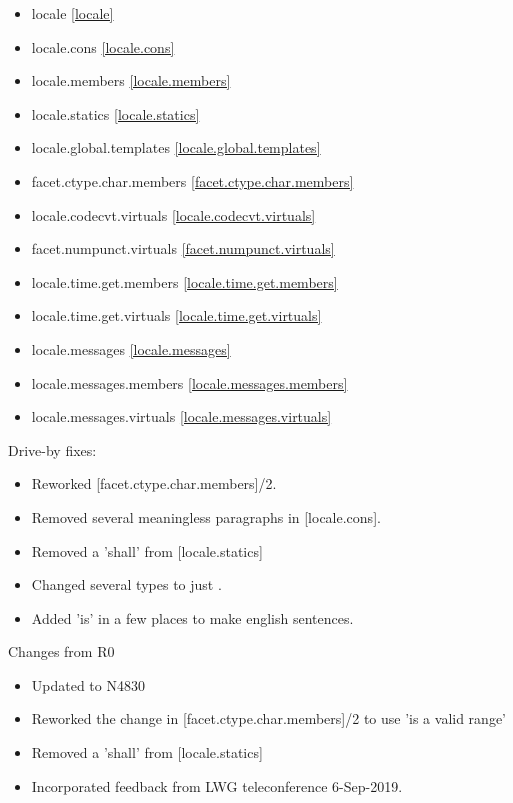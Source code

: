 \begin{multicols}{2}
\begin{itemize}
\item{locale}						\ref{locale}
\item{locale.cons}					\ref{locale.cons}
\item{locale.members}				\ref{locale.members}
\item{locale.statics}				\ref{locale.statics}
\item{locale.global.templates}		\ref{locale.global.templates}
\item{facet.ctype.char.members}		\ref{facet.ctype.char.members}
\item{locale.codecvt.virtuals}		\ref{locale.codecvt.virtuals}
\item{facet.numpunct.virtuals}		\ref{facet.numpunct.virtuals}
\item{locale.time.get.members}		\ref{locale.time.get.members}
\item{locale.time.get.virtuals}		\ref{locale.time.get.virtuals}
\item{locale.messages}				\ref{locale.messages}
\item{locale.messages.members}		\ref{locale.messages.members}
\item{locale.messages.virtuals}		\ref{locale.messages.virtuals}
\end{itemize}
\end{multicols}

Drive-by fixes:
\begin{itemize}
\item{Reworked [facet.ctype.char.members]/2.}
\item{Removed several meaningless paragraphs in [locale.cons].}
\item{Removed a 'shall' from [locale.statics]}
\item{Changed several  types to just .}
\item{Added 'is' in a few places to make english sentences.}
\end{itemize}

Changes from R0
\begin{itemize}
\item{Updated to N4830}
\item{Reworked the change in [facet.ctype.char.members]/2 to use 'is a valid range'}
\item{Removed a 'shall' from [locale.statics]}
\item{Incorporated feedback from LWG teleconference 6-Sep-2019.}
\end{itemize}

